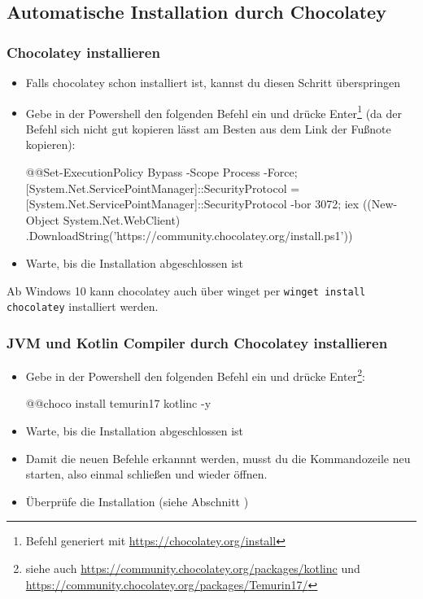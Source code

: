 \subsection*{Automatische Installation durch Chocolatey}
\subsubsection*{Chocolatey installieren}
\begin{itemize}
    \item Falls chocolatey schon installiert ist, kannst du diesen Schritt überspringen
    \item Gebe in der Powershell den folgenden Befehl ein und drücke Enter\footnote{Befehl generiert mit \url{https://chocolatey.org/install}} (da der Befehl sich nicht gut kopieren lässt am Besten aus dem Link der Fußnote kopieren):
        \begin{commandshell}
            @\shellprefix{}@Set-ExecutionPolicy Bypass -Scope Process -Force;
            [System.Net.ServicePointManager]::SecurityProtocol =
            [System.Net.ServicePointManager]::SecurityProtocol -bor 3072;
            iex ((New-Object System.Net.WebClient)
            .DownloadString('https://community.chocolatey.org/install.ps1'))
        \end{commandshell}
    \item Warte, bis die Installation abgeschlossen ist
\end{itemize}
\begin{hinweis}
    Ab Windows 10 kann chocolatey auch über winget per \texttt{winget install chocolatey} installiert werden.
\end{hinweis}
\clearpage
\subsubsection*{JVM und Kotlin Compiler durch Chocolatey installieren}
\begin{itemize}
    \item Gebe in der Powershell den folgenden Befehl ein und drücke Enter\footnote{siehe auch \url{https://community.chocolatey.org/packages/kotlinc} und \url{https://community.chocolatey.org/packages/Temurin17/}}:
        \begin{commandshell}
            @\shellprefix{}@choco install temurin17 kotlinc -y
        \end{commandshell}
    \item Warte, bis die Installation abgeschlossen ist
    \item Damit die neuen Befehle erkannnt werden, musst du die Kommandozeile neu starten, also einmal schließen und wieder öffnen.
    \item Überprüfe die Installation (siehe Abschnitt )
\end{itemize}
